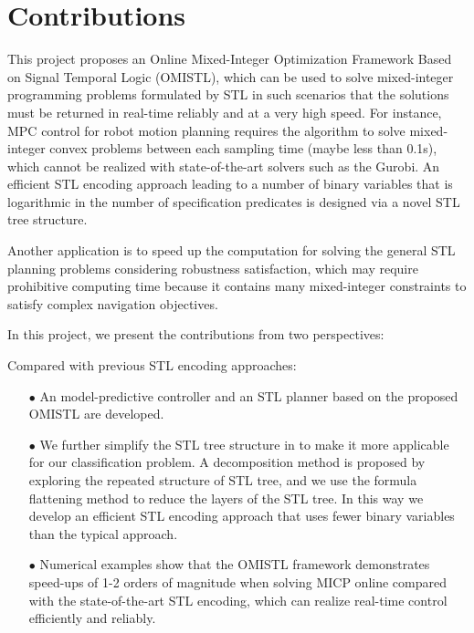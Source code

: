 \documentclass[a4paper]{report}
\begin{document}
\section{Contributions}

This project proposes an Online Mixed-Integer Optimization Framework Based on Signal Temporal Logic (OMISTL), which can be used to solve mixed-integer programming problems formulated by STL in such scenarios that the solutions must be returned in real-time reliably and at a very high speed. For instance, MPC control for robot motion planning requires the algorithm to solve mixed-integer convex problems between each sampling time (maybe less than 0.1s), which cannot be realized with state-of-the-art solvers such as the Gurobi. An efficient STL encoding approach leading to a number of binary variables that is logarithmic in the number of specification predicates is designed via a novel STL tree structure.

Another application is to speed up the computation for solving the general STL planning problems considering robustness satisfaction, which may require prohibitive computing time because it contains many mixed-integer constraints to satisfy complex navigation objectives.

In this project, we present the contributions from two perspectives:

Compared with previous STL encoding approaches:

\begin{itemize}
    \item[$\bullet$]An model-predictive controller and an STL planner based on the proposed OMISTL are developed. 
    \end{itemize}

    \begin{itemize}
        \item[$\bullet$] We further simplify the STL tree structure in \cite[]{kurtz2022mixed} to make it more applicable for our classification problem. A decomposition method is proposed by exploring the repeated structure of STL tree, and we use the formula flattening method to reduce the layers of the STL tree. In this way we develop an efficient STL encoding approach that uses fewer binary variables than the typical approach.
        \end{itemize}
    \begin{itemize} 
        \item[$\bullet$]Numerical examples show that the OMISTL framework demonstrates speed-ups of 1-2 orders of magnitude when solving MICP online compared with the state-of-the-art STL encoding, which can realize real-time control efficiently and reliably.
    \end{itemize}
\end{document}

